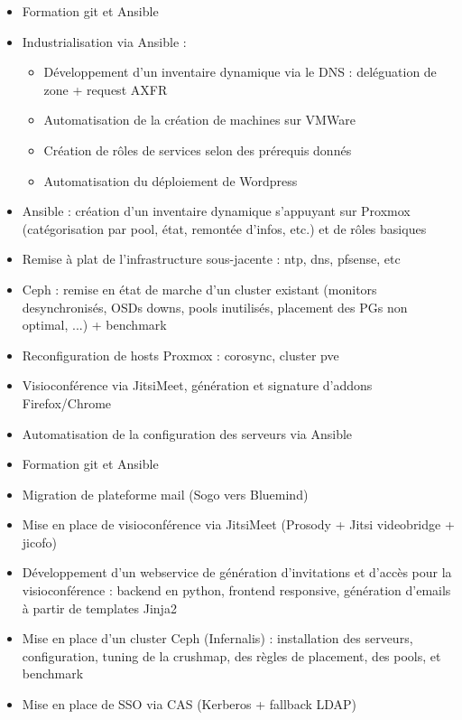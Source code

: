 \documentclass[10pt,a4paper]{moderncv}
\begin{document}
{
  \begin{itemize}
    \item Formation git et Ansible
    \item Industrialisation via Ansible :
      \begin{itemize}
        \item Développement d'un inventaire dynamique via le DNS : deléguation
          de zone + request AXFR
        \item Automatisation de la création de machines sur VMWare
        \item Création de rôles de services selon des prérequis donnés
        \item Automatisation du déploiement de Wordpress
      \end{itemize}
  \end{itemize}
}

{
  \begin{itemize}
    \item Ansible : création d'un inventaire dynamique s'appuyant sur Proxmox
      (catégorisation par pool, état, remontée d'infos, etc.) et de rôles
      basiques
    \item Remise à plat de l'infrastructure sous-jacente : ntp, dns, pfsense,
      etc
    \item Ceph : remise en état de marche d'un cluster existant (monitors
      desynchronisés, OSDs downs, pools inutilisés, placement des PGs non
      optimal, ...) + benchmark
    \item Reconfiguration de hosts Proxmox : corosync, cluster pve
    \item Visioconférence via JitsiMeet, génération et signature d'addons
      Firefox/Chrome
  \end{itemize}
}

{
  \begin{itemize}
    \item Automatisation de la configuration des serveurs via Ansible
    \item Formation git et Ansible
    \item Migration de plateforme mail (Sogo vers Bluemind)
    \item Mise en place de visioconférence via JitsiMeet (Prosody + Jitsi
      videobridge + jicofo)
    \item Développement d'un webservice de génération d'invitations et d'accès
      pour la visioconférence : backend en python, frontend responsive,
      génération d'emails à partir de templates Jinja2
    \item Mise en place d'un cluster Ceph (Infernalis) : installation des
      serveurs, configuration, tuning de la crushmap, des règles de placement,
      des pools, et benchmark
    \item Mise en place de SSO via CAS (Kerberos + fallback LDAP)
  \end{itemize}
}
\end{document}
